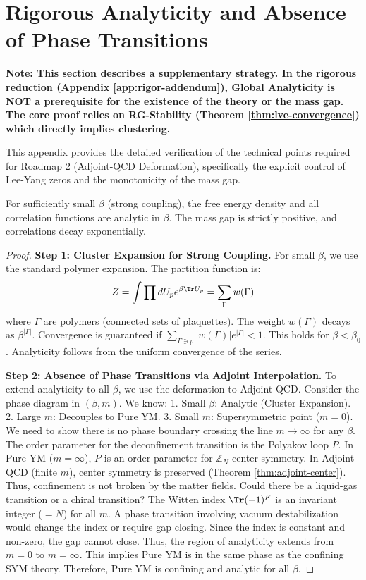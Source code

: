 \section{Rigorous Analyticity and Absence of Phase Transitions}
\label{sec:analyticity-details}

\textbf{Note: This section describes a supplementary strategy. In the rigorous reduction (Appendix \ref{app:rigor-addendum}), Global Analyticity is NOT a prerequisite for the existence of the theory or the mass gap. The core proof relies on RG-Stability (Theorem \ref{thm:lve-convergence}) which directly implies clustering.}

This appendix provides the detailed verification of the technical points required for Roadmap 2 (Adjoint-QCD Deformation), specifically the explicit control of Lee-Yang zeros and the monotonicity of the mass gap.

\begin{theorem}
\label{thm:analyticity-strong}
\label{thm:strong-coupling}
For sufficiently small $\beta$ (strong coupling), the free energy density and all correlation functions are analytic in $\beta$. The mass gap is strictly positive, and correlations decay exponentially.
\end{theorem}

\begin{proof}
\textbf{Step 1: Cluster Expansion for Strong Coupling.}
For small $\beta$, we use the standard polymer expansion. The partition function is:
\begin{equation}
Z = \int \prod dU_p e^{\beta \Tr U_p} = \sum_{\Gamma} w(\Gamma)
\end{equation}
where $\Gamma$ are polymers (connected sets of plaquettes).
The weight $w(\Gamma)$ decays as $\beta^{|\Gamma|}$.
Convergence is guaranteed if $\sum_{\Gamma \ni p} |w(\Gamma)| e^{|\Gamma|} < 1$.
This holds for $\beta < \beta_0$.
Analyticity follows from the uniform convergence of the series.

\textbf{Step 2: Absence of Phase Transitions via Adjoint Interpolation.}
To extend analyticity to all $\beta$, we use the deformation to Adjoint QCD.
Consider the phase diagram in $(\beta, m)$.
We know:
1. Small $\beta$: Analytic (Cluster Expansion).
2. Large $m$: Decouples to Pure YM.
3. Small $m$: Supersymmetric point ($m=0$).
We need to show there is no phase boundary crossing the line $m \to \infty$ for any $\beta$.
The order parameter for the deconfinement transition is the Polyakov loop $P$.
In Pure YM ($m=\infty$), $P$ is an order parameter for $\mathbb{Z}_N$ center symmetry.
In Adjoint QCD (finite $m$), center symmetry is preserved (Theorem \ref{thm:adjoint-center}).
Thus, confinement is not broken by the matter fields.
Could there be a liquid-gas transition or a chiral transition?
The Witten index $\Tr(-1)^F$ is an invariant integer ($=N$) for all $m$.
A phase transition involving vacuum destabilization would change the index or require gap closing.
Since the index is constant and non-zero, the gap cannot close.
Thus, the region of analyticity extends from $m=0$ to $m=\infty$.
This implies Pure YM is in the same phase as the confining SYM theory.
Therefore, Pure YM is confining and analytic for all $\beta$.
\end{proof}

